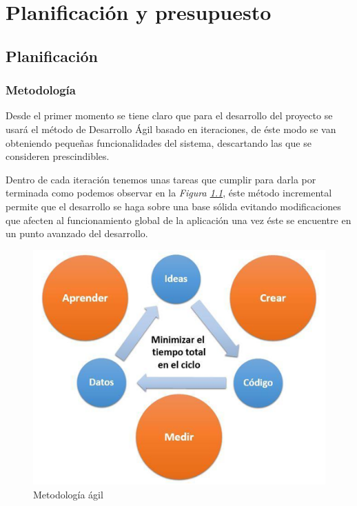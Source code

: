 \chapter{Planificación y presupuesto}

\section{Planificación}



\subsection{Metodología}

Desde el primer momento se tiene claro que para el desarrollo del proyecto se usará el método de Desarrollo Ágil basado en iteraciones, de éste modo se van obteniendo pequeñas funcionalidades del sistema, descartando las que se consideren prescindibles.

Dentro de cada iteración tenemos unas tareas que cumplir para darla por terminada como podemos observar en la \textit{Figura \ref{fig:met_agil}}, éste método incremental permite que el desarrollo se haga sobre una base sólida evitando modificaciones que afecten al funcionamiento global de la aplicación una vez éste se encuentre en un punto avanzado del desarrollo.


\begin{figure}[!ht]
  \begin{center}
    \includegraphics[scale=0.70]{../images/metodologia/agil.png}
    \caption{Metodología ágil}
    \label{fig:met_agil}
  \end{center}
\end{figure}


